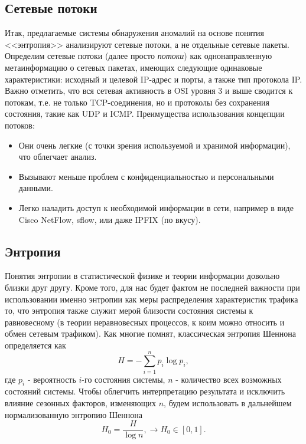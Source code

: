 \documentclass[]{interact}
\theoremstyle{plain}%
\theoremstyle{definition}
\theoremstyle{remark}
\begin{document}
\subsection{Сетевые потоки}\label{class}

Итак, предлагаемые системы обнаружения аномалий на основе понятия <<энтропия>> анализируют сетевые потоки, а не отдельные сетевые пакеты.
Определим сетевые потоки (далее просто \textit{потоки}) как однонаправленную метаинформацию о сетевых пакетах, имеющих следующие одинаковые характеристики: исходный и целевой IP-адрес и порты, а также тип протокола IP. Важно отметить, что вся сетевая активность в OSI
уровня 3 и выше сводится к потокам, т.е. не только TCP-соединения, но и протоколы без сохранения состояния, такие как UDP и ICMP.
Преимущества использования концепции потоков:
\begin{itemize}
    \item Они очень легкие (с точки зрения используемой и хранимой информации), что облегчает анализ.
    \item Вызывают меньше проблем с конфиденциальностью и персональными данными.
    \item Легко наладить доступ к необходимой информации в сети, например в виде Cisco NetFlow, sflow, или даже IPFIX (по вкусу).
\end{itemize}


\subsection{Энтропия}
Понятия энтропии в статистической физике и теории информации довольно близки друг другу. Кроме того, для нас будет фактом не последней важности при использовании именно энтропии как меры распределения характеристик трафика то, что энтропия также служит мерой близости состояния системы к равновесному (в теории неравновесных процессов, к коим можно относить и обмен сетевым трафиком). Как многие помнят, классическая энтропия Шеннона определяется как
\begin{equation}
    H = - \sum^n_{i=1} p_i \log p_i,
\end{equation}
где $p_i$ - вероятность $i$-го состояния системы, $n$ - количество всех возможных состояний системы. Чтобы облегчить интерпретацию результата и исключить влияние сезонных факторов, изменяющих $n$, будем использовать в дальнейшем нормализованную энтропию Шеннона
\begin{equation}
    H_0 = \frac{H}{\log n}, \longrightarrow H_0 \in [0, 1].
\end{equation}
\end{document}
